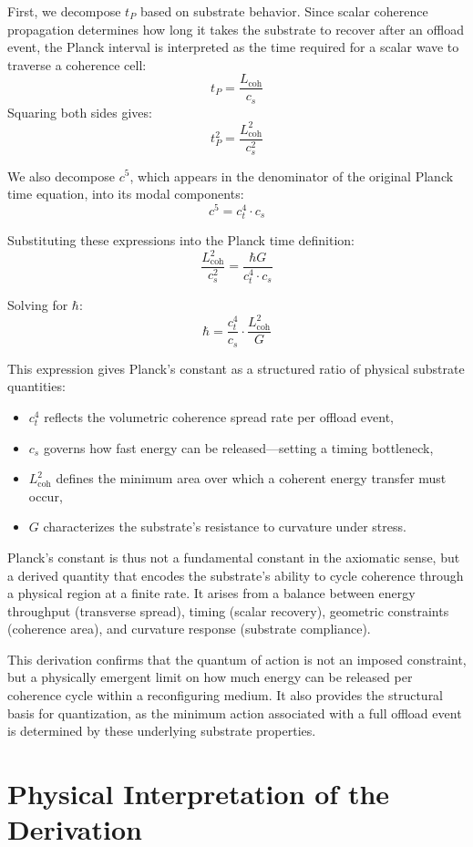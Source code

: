\documentclass[ht-mathphys]{ht-fmt}
\theoremstyle{thmstyleone}%
\theoremstyle{thmstyletwo}%
\theoremstyle{thmstylethree}%
\begin{document}
First, we decompose $t_P$ based on substrate behavior. Since scalar coherence propagation determines how long it takes the substrate to recover after an offload event, the Planck interval is interpreted as the time required for a scalar wave to traverse a coherence cell:
\[
t_P = \frac{L_{\text{coh}}}{c_s}
\]
Squaring both sides gives:
\[
t_P^2 = \frac{L_{\text{coh}}^2}{c_s^2}
\]

We also decompose $c^5$, which appears in the denominator of the original Planck time equation, into its modal components:
\[
c^5 = c_t^4 \cdot c_s
\]

Substituting these expressions into the Planck time definition:
\[
\frac{L_{\text{coh}}^2}{c_s^2} = \frac{\hbar G}{c_t^4 \cdot c_s}
\]

Solving for $\hbar$:
\[
\hbar = \frac{c_t^4}{c_s} \cdot \frac{L_{\text{coh}}^2}{G}
\]

This expression gives Planck’s constant as a structured ratio of physical substrate quantities:

\begin{itemize}
    \item $c_t^4$ reflects the volumetric coherence spread rate per offload event,
    \item $c_s$ governs how fast energy can be released—setting a timing bottleneck,
    \item $L_{\text{coh}}^2$ defines the minimum area over which a coherent energy transfer must occur,
    \item $G$ characterizes the substrate’s resistance to curvature under stress.
\end{itemize}

Planck’s constant is thus not a fundamental constant in the axiomatic sense, but a derived quantity that encodes the substrate’s ability to cycle coherence through a physical region at a finite rate. It arises from a balance between energy throughput (transverse spread), timing (scalar recovery), geometric constraints (coherence area), and curvature response (substrate compliance).

This derivation confirms that the quantum of action is not an imposed constraint, but a physically emergent limit on how much energy can be released per coherence cycle within a reconfiguring medium. It also provides the structural basis for quantization, as the minimum action associated with a full offload event is determined by these underlying substrate properties.

\section{Physical Interpretation of the Derivation}
\end{document}
